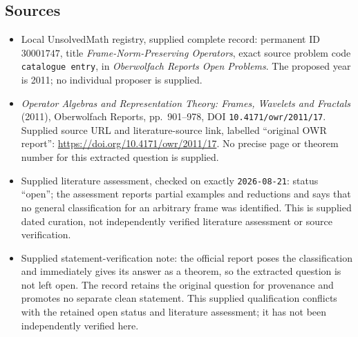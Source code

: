 \documentclass[11pt]{article}
\begin{document}
\subsection{Sources}
\begin{itemize}
\item Local UnsolvedMath registry, supplied complete record: permanent ID \(30001747\), title \emph{Frame-Norm-Preserving Operators}, exact source problem code \texttt{catalogue entry}, in \emph{Oberwolfach Reports Open Problems}. The proposed year is 2011; no individual proposer is supplied.
\item \emph{Operator Algebras and Representation Theory: Frames, Wavelets and Fractals} (2011), Oberwolfach Reports, pp.~901--978, DOI \texttt{10.4171/owr/2011/17}. Supplied source URL and literature-source link, labelled ``original OWR report'': \url{https://doi.org/10.4171/owr/2011/17}. No precise page or theorem number for this extracted question is supplied.
\item Supplied literature assessment, checked on exactly \texttt{2026-08-21}: status ``open''; the assessment reports partial examples and reductions and says that no general classification for an arbitrary frame was identified. This is supplied dated curation, not independently verified literature assessment or source verification.
\item Supplied statement-verification note: the official report poses the classification and immediately gives its answer as a theorem, so the extracted question is not left open. The record retains the original question for provenance and promotes no separate clean statement. This supplied qualification conflicts with the retained open status and literature assessment; it has not been independently verified here.
\end{itemize}
\end{document}
